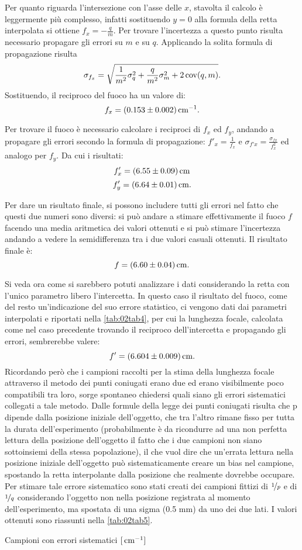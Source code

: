Per quanto riguarda l'intersezione con l'asse delle $x$, stavolta il calcolo è leggermente più complesso, infatti sostituendo $y = 0$
 alla formula della retta interpolata si ottiene $f_x = -\frac{q}{m}$.  Per trovare l'incertezza a questo punto risulta necessario
 propagare gli errori su $m$ e su $q$. Applicando la solita formula di propagazione risulta
\[\sigma_{f_x} = \sqrt {\frac{1} {m^2} \sigma_q^2 + \frac{q}{m^2} \sigma_m^2 + 2 \operatorname{cov} (q,m) }.\] Sostituendo,
 il reciproco del fuoco ha un valore di:
\[f_x = (0.153 \pm 0.002) \,\mathrm{cm}^{-1}.\]

Per trovare il fuoco è necessario calcolare i reciproci di $f_x$ ed $f_y$, andando a propagare gli errori secondo la formula di 
propagazione: $f'_x = \frac{1}{f_x}$ e $\sigma_{f'x} = \frac{\sigma_{fx}}{f_{x}^2}$ ed analogo per $f_y$. Da cui i risultati:
\[f'_x = (6.55 \pm 0.09) \,\mathrm{cm} \]
\[f'_y = (6.64 \pm 0.01) \,\mathrm{cm} .\]

Per dare un risultato finale, si possono includere tutti gli errori nel fatto che questi due numeri sono diversi: si può andare a
 stimare effettivamente il fuoco $f$ facendo una media aritmetica dei valori ottenuti e si può stimare l'incertezza
 andando a vedere la
 semidifferenza tra i due valori casuali ottenuti. Il risultato finale è:
\[f = (6.60 \pm 0.04) \,\mathrm{cm} .\]

Si veda ora come si sarebbero potuti analizzare i dati considerando la retta con l'unico parametro libero l'intercetta. In questo
 caso il risultato del fuoco, come del resto un'indicazione del suo errore statistico, ci vengono dati dai parametri interpolati e
 riportati nella \autoref{tab:02tab4}, per cui la lunghezza focale, calcolata come nel caso precedente trovando il reciproco
 dell'intercetta e propagando gli errori, sembrerebbe valere:
\[f' = (6.604 \pm 0.009) \,\mathrm{cm} .\]
Ricordando però che i campioni raccolti per la stima della lunghezza focale attraverso il metodo dei punti coniugati erano due ed
 erano visibilmente poco compatibili tra loro, sorge spontaneo chiedersi quali siano gli errori sistematici collegati a tale metodo.
 Dalle formule della legge dei punti coniugati risulta che p dipende dalla posizione iniziale dell'oggetto, che tra
 l'altro rimane fisso per tutta la durata dell'esperimento (probabilmente è da ricondurre ad una non perfetta lettura della posizione
 dell'oggetto il fatto che i due campioni non siano sottoinsiemi della stessa popolazione), il che vuol dire che un'errata lettura
 nella posizione iniziale dell'oggetto può sistematicamente creare un bias nel campione, spostando la retta interpolante dalla
 posizione che realmente dovrebbe occupare. Per stimare tale errore sistematico sono stati creati dei campioni fittizi di $\nicefrac{1}{p}$ e
 di $\nicefrac{1}{q}$ considerando l'oggetto non nella posizione registrata al momento dell'esperimento, ma spostata di una sigma (0.5 mm) da
 uno dei due lati. I valori ottenuti sono riassunti nella \autoref{tab:02tab5}.
\begin{tabella}
	\centering
	
	\caption{Campioni con errori sistematici $[\,\mathrm{cm}^{-1}]$}
	\label{tab:02tab5}
\end{tabella}

